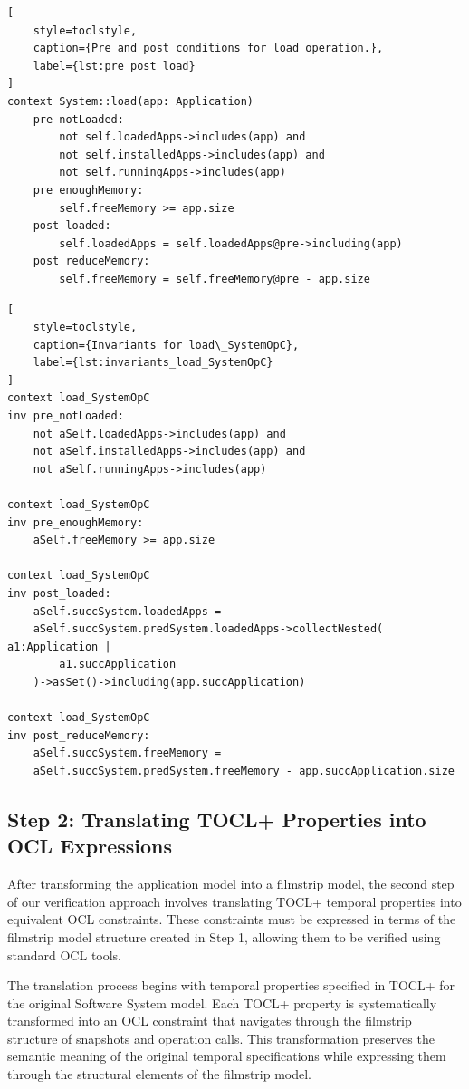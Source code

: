 \begin{lstlisting}[
    style=toclstyle, 
    caption={Pre and post conditions for load operation.}, 
    label={lst:pre_post_load}
]
context System::load(app: Application)
    pre notLoaded: 
        not self.loadedApps->includes(app) and
        not self.installedApps->includes(app) and
        not self.runningApps->includes(app)
    pre enoughMemory: 
        self.freeMemory >= app.size
    post loaded: 
        self.loadedApps = self.loadedApps@pre->including(app)
    post reduceMemory: 
        self.freeMemory = self.freeMemory@pre - app.size
\end{lstlisting}

\begin{lstlisting}[
    style=toclstyle, 
    caption={Invariants for load\_SystemOpC}, 
    label={lst:invariants_load_SystemOpC}
]
context load_SystemOpC 
inv pre_notLoaded:
    not aSelf.loadedApps->includes(app) and 
    not aSelf.installedApps->includes(app) and 
    not aSelf.runningApps->includes(app)

context load_SystemOpC 
inv pre_enoughMemory:
    aSelf.freeMemory >= app.size

context load_SystemOpC 
inv post_loaded:
    aSelf.succSystem.loadedApps = 
    aSelf.succSystem.predSystem.loadedApps->collectNested( a1:Application | 
        a1.succApplication 
    )->asSet()->including(app.succApplication)

context load_SystemOpC 
inv post_reduceMemory:
    aSelf.succSystem.freeMemory = 
    aSelf.succSystem.predSystem.freeMemory - app.succApplication.size
\end{lstlisting}


\subsection{Step 2: Translating TOCL+ Properties into OCL Expressions}

\hspace{1cm} After transforming the application model into a filmstrip model, the second step of our verification approach involves translating TOCL+ temporal properties into equivalent OCL constraints. These constraints must be expressed in terms of the filmstrip model structure created in Step 1, allowing them to be verified using standard OCL tools.

The translation process begins with temporal properties specified in TOCL+ for the original Software System model. Each TOCL+ property is systematically transformed into an OCL constraint that navigates through the filmstrip structure of snapshots and operation calls. This transformation preserves the semantic meaning of the original temporal specifications while expressing them through the structural elements of the filmstrip model.

